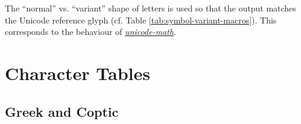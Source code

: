 \documentclass[a4paper]{scrartcl}
\newcommand{\pkgref}[1]{\emph{\href{https://ctan.org/pkg/#1}{#1}}}
\begin{document}
The ``normal'' vs. ``variant'' shape of letters is used
so that the output matches the Unicode reference glyph
(cf. Table \ref{tab:symbol-variant-macros}).
This corresponds to the behaviour of \pkgref{unicode-math}.


\section{Character Tables}

\subsection{Greek and Coptic}

\newcommand*{\GreekAndCopticI}{%
  \ensuregreek{%
    \'{}             %
    \"'{}            %
    \'\Alpha{}       %
    \textanoteleia{} %
    \'\Epsilon{}     %
    \'\Eta{}         %
    \'\Iota{}        %
    \'\Omicron{}     %
    \'\Upsilon{}     %
    \'\Omega{}       %
}}
\newcommand*{\GreekAndCopticII}{%
  \ensuregreek{%
    \'"\iota{} %
    \Alpha{}         %
    \Beta{}          %
    \Gamma{}         %
    \Delta{}         %
    \Epsilon{}       %
    \Zeta{}          %
    \Eta{}           %
    \Theta{}         %
    \Iota{}          %
    \Kappa{}         %
    \Lambda{}        %
    \Mu{}            %
    \Nu{}            %
    \Xi{}            %
    \Omicron{}       %
}}
\newcommand*{\GreekAndCopticIII}{%
  \ensuregreek{%
    \Pi{}            %
    \Rho{}           %
    \Sigma{}         %
    \Tau{}           %
    \Upsilon{}       %
    \Phi{}           %
    \Chi{}           %
    \Psi{}           %
    \Omega{}         %
    \"\Iota{}        %
    \"\Upsilon{}     %
    \'\alpha{}       %
    \'\epsilon{}     %
    \'\eta{}         %
    \'\iota{}        %
}}
\newcommand*{\GreekAndCopticIV}{%
  \ensuregreek{%
    \"'\upsilon{}    %
    \alpha{}         %
    \beta{}          %
    \gamma{}         %
    \delta{}         %
    \epsilon{}       %
    \zeta{}          %
    \eta{}           %
    \theta{}         %
    \iota{}          %
    \kappa{}         %
    \lambda{}        %
    \mu{}            %
    \nu{}            %
    \xi{}            %
    \omicron{}       %
}}
\newcommand*{\GreekAndCopticV}{%
  \ensuregreek{%
    \pi{}            %
    \rho{}           %
    \finalsigma{}    %
    \sigma{}         %
    \tau{}           %
    \upsilon{}       %
    \phi{}           %
    \chi{}           %
    \psi{}           %
    \omega{}         %
    \"\iota{}        %
    \"\upsilon{}     %
    \'\omicron{}     %
    \'\upsilon{}     %
    \'\omega{}       %
}}
\end{document}
